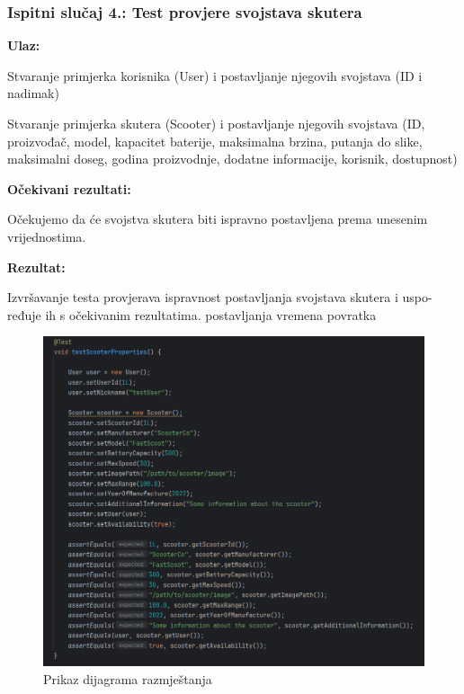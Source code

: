 			\subsubsection{Ispitni slučaj 4.: Test provjere svojstava skutera}

					\noindent\textbf{Ulaz:}
					\begin{packed_item}
						\item Stvaranje primjerka korisnika (User) i postavljanje njegovih svojstava (ID i nadimak)
						\item Stvaranje primjerka skutera (Scooter) i postavljanje njegovih svojstava (ID, proizvođač, model, kapacitet baterije, maksimalna brzina, putanja do slike, maksimalni doseg, godina proizvodnje, dodatne informacije, korisnik, dostupnost)
					\end{packed_item}
					
					\noindent\textbf{Očekivani rezultati:}
					\begin{packed_item}
						\item Očekujemo da će svojstva skutera biti ispravno postavljena prema unesenim vrijednostima.
					\end{packed_item}
					\noindent\textbf{Rezultat:}
					\begin{packed_item}
						\item  Izvršavanje testa provjerava ispravnost postavljanja svojstava skutera i uspo- ređuje ih s očekivanim rezultatima.
						 postavljanja vremena povratka
					\end{packed_item}
              \begin{figure} [H]
              	\centering
              	\includegraphics[width=0.7\linewidth]{slike/ScooterTest.png}
              	\caption{Prikaz dijagrama razmještanja}
              	\label{fig:Prikaz dijagrama razmještanja}
              \end{figure}

